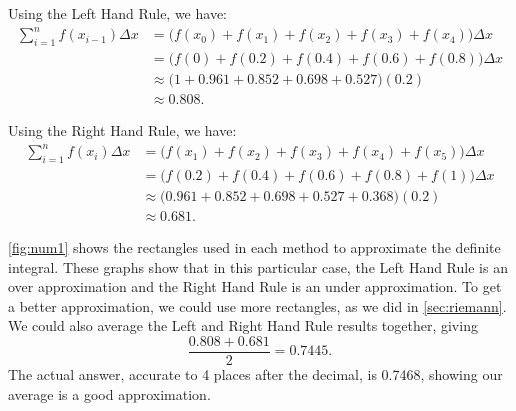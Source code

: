 \begin{example}
Using the Left Hand Rule, we have:
\begin{align*}
	\sum_{i=1}^n f(x_{i-1})\Delta x
	&= \bigl(f(x_0)+f(x_1)+f(x_2) + f(x_3) + f(x_4)\bigr)\Delta x \\
	&= \bigl(f(0) + f(0.2) + f(0.4) + f(0.6) + f(0.8)\bigr)\Delta x \\
	&\approx \bigl(1+0.961 + 0.852 + 0.698 + 0.527\bigr)(0.2)\\
	&\approx 0.808.
\end{align*}

Using the Right Hand Rule, we have:
\begin{align*}
	\sum_{i=1}^n f(x_i)\Delta x
	&= \bigl(f(x_1)+f(x_2) + f(x_3) + f(x_4) + f(x_5)\bigr)\Delta x \\
	&= \bigl(f(0.2) + f(0.4) + f(0.6) + f(0.8)+f(1)\bigr)\Delta x \\
	&\approx \bigl(0.961 +0.852 + 0.698 + 0.527 + 0.368\bigr)(0.2)\\
	&\approx 0.681.
\end{align*}

\autoref{fig:num1} shows the rectangles used in each method to approximate the definite integral. These graphs show that in this particular case, the Left Hand Rule is an over approximation and the Right Hand Rule is an under approximation. To get a better approximation, we could use more rectangles, as we did in \autoref{sec:riemann}. We could also average the Left and Right Hand Rule results together, giving
\[\frac{0.808 + 0.681}{2} = 0.7445.\]
The actual answer, accurate to 4 places after the decimal, is 0.7468, showing our average is a good approximation.
\end{example}



